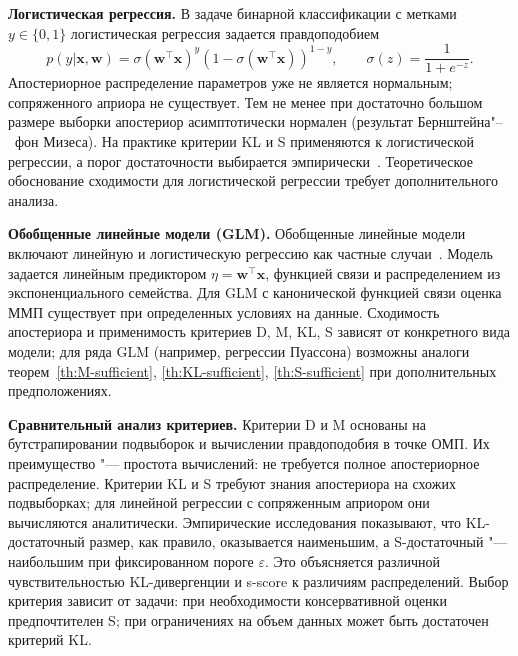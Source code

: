 \textbf{Логистическая регрессия.} В задаче бинарной классификации с метками $y \in \{0, 1\}$ логистическая регрессия задается правдоподобием
\begin{equation}
p(y | \mathbf{x}, \mathbf{w}) = \sigma(\mathbf{w}^\top \mathbf{x})^y (1 - \sigma(\mathbf{w}^\top \mathbf{x}))^{1-y}, \qquad \sigma(z) = \frac{1}{1 + e^{-z}}.
\end{equation}
Апостериорное распределение параметров уже не является нормальным; сопряженного априора не существует. Тем не менее при достаточно большом размере выборки апостериор асимптотически нормален (результат Бернштейна"--~фон Мизеса). На практике критерии KL и S применяются к логистической регрессии, а порог достаточности выбирается эмпирически~\cite{MOTRENKO2014743}. Теоретическое обоснование сходимости для логистической регрессии требует дополнительного анализа.

\textbf{Обобщенные линейные модели (GLM).} Обобщенные линейные модели включают линейную и логистическую регрессию как частные случаи~\cite{mccullagh1989generalized}. Модель задается линейным предиктором $\eta = \mathbf{w}^\top \mathbf{x}$, функцией связи и распределением из экспоненциального семейства. Для GLM с канонической функцией связи оценка ММП существует при определенных условиях на данные. Сходимость апостериора и применимость критериев D, M, KL, S зависят от конкретного вида модели; для ряда GLM (например, регрессии Пуассона) возможны аналоги теорем~\ref{th:M-sufficient}, \ref{th:KL-sufficient}, \ref{th:S-sufficient} при дополнительных предположениях.

\textbf{Сравнительный анализ критериев.} Критерии D и M основаны на бутстрапировании подвыборок и вычислении правдоподобия в точке ОМП. Их преимущество "--- простота вычислений: не требуется полное апостериорное распределение. Критерии KL и S требуют знания апостериора на схожих подвыборках; для линейной регрессии с сопряженным априором они вычисляются аналитически. Эмпирические исследования показывают, что KL-достаточный размер, как правило, оказывается наименьшим, а S-достаточный "--- наибольшим при фиксированном пороге $\varepsilon$. Это объясняется различной чувствительностью KL-дивергенции и s-score к различиям распределений. Выбор критерия зависит от задачи: при необходимости консервативной оценки предпочтителен S; при ограничениях на объем данных может быть достаточен критерий KL.